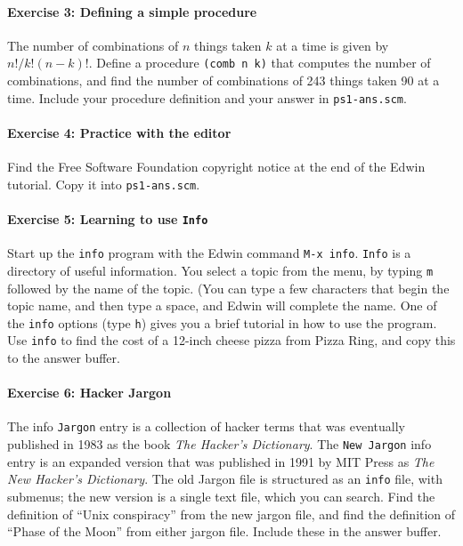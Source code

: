 \paragraph{Exercise 3: Defining a simple procedure}

The number of combinations of $n$ things taken $k$ at a time is given
by $n!/k!(n-k)!$.  Define a procedure {\tt (comb n k)} that computes
the number of combinations, and find the number of combinations of 243
things taken 90 at a time.  Include your procedure definition and your
answer in {\tt ps1-ans.scm}.

\paragraph{Exercise 4: Practice with the editor}

Find the Free Software Foundation copyright notice at the end of the Edwin
tutorial.  Copy it into {\tt ps1-ans.scm}.

\paragraph{Exercise 5: Learning to use {\tt Info}}

Start up the {\tt info} program with the Edwin command {\tt M-x info}.
{\tt Info} is a directory of useful information.  You select a topic
from the menu, by typing {\tt m} followed by the name of the topic.
(You can type a few characters that begin the topic name, and then type
a space, and Edwin will complete the name.  One of the {\tt info}
options (type {\tt h}) gives you a brief tutorial in how to use the
program.  Use {\tt info} to find the cost of a 12-inch cheese pizza
from Pizza Ring, and copy this to the answer buffer.

\paragraph{Exercise 6: Hacker Jargon}

The info {\tt Jargon} entry is a collection of hacker terms that was
eventually published in 1983 as the book {\it The Hacker's
Dictionary}.  The {\tt New Jargon} info entry is an expanded version
that was published in 1991 by MIT Press as {\it The New Hacker's
Dictionary}.  The old Jargon file is structured as an {\tt info}
file, with submenus; the new version is a single text file, which you
can search.  Find the definition of ``Unix conspiracy'' from the new
jargon file, and find the definition of ``Phase of the Moon'' from
either jargon file.  Include these in the answer buffer.


